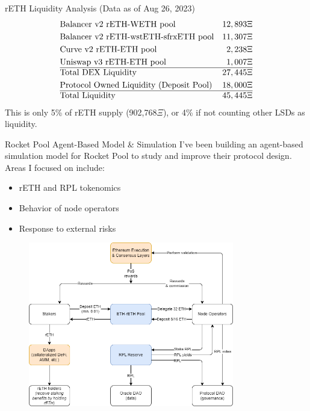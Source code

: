 \documentclass{beamer}
\begin{document}
\begin{frame}{rETH Liquidity Analysis}
    (Data as of Aug 26, 2023)
    \begin{align*}
        &\text{Balancer v2 rETH-WETH pool} & 12,893\Xi\\
        &\text{Balancer v2 rETH-wstETH-sfrxETH pool} & 11,307\Xi\\
        &\text{Curve v2 rETH-ETH pool} & 2,238\Xi\\
        &\text{Uniswap v3 rETH-ETH pool} & 1,007\Xi\\
        \hline
        &\text{Total DEX Liquidity} & 27,445\Xi\\
        &\text{Protocol Owned Liquidity (Deposit Pool)} & 18,000\Xi\\
        \hline
        &\text{Total Liquidity} & 45,445\Xi\\
    \end{align*}
    This is only 5\% of rETH supply (902,768$\Xi$), or 4\% if not counting other LSDs as liquidity.
\end{frame}

\begin{frame}{Rocket Pool Agent-Based Model \& Simulation}
    I've been building an agent-based simulation model for Rocket Pool to study and improve their protocol design. Areas I focused on include:\\
    \begin{itemize}
        \item rETH and RPL tokenomics
        \item Behavior of node operators
        \item Response to external risks
    \end{itemize}
\end{frame}

\begin{frame}
    \begin{figure}
        \centering
        \includegraphics[width=0.8\textwidth]{figures/Rocketpool tokenomics.png}
    \end{figure}
\end{frame}
\end{document}
